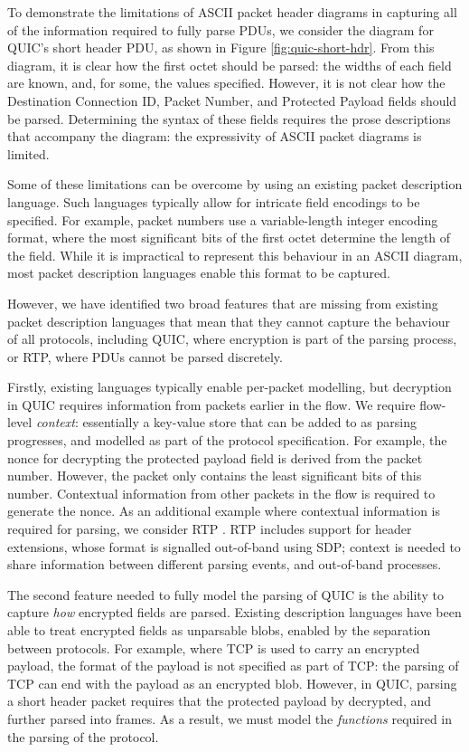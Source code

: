 \documentclass[10pt,sigconf]{acmart}
\begin{document}
To demonstrate the limitations of ASCII packet header diagrams in capturing all of the
information required to fully parse PDUs, we consider the diagram for QUIC's short header
PDU, as shown in Figure \ref{fig:quic-short-hdr}. From this diagram, it is clear how the
first octet should be parsed: the widths of each field are known, and, for some, the
values specified. However, it is not clear how the Destination Connection ID, Packet
Number, and Protected Payload fields should be parsed. Determining the syntax
of these fields requires the prose descriptions that accompany the diagram: the
expressivity of ASCII packet diagrams is limited.

Some of these limitations can be overcome by using an existing packet
description language. Such languages typically allow for intricate field encodings to be
specified. For example, packet numbers use a variable-length integer encoding format,
where the most significant bits of the first octet determine the length of the field.
While it is impractical to represent this behaviour in an ASCII diagram, most packet
description languages enable this format to be captured.

However, we have identified two broad features that are missing from existing packet
description languages that mean that they cannot capture the behaviour of all 
protocols, including QUIC, where
encryption is part of the parsing process, or RTP, where PDUs cannot be parsed discretely.

Firstly, existing languages typically enable per-packet modelling, but decryption in QUIC
requires information from packets earlier in the flow. We require flow-level
\emph{context}: essentially a key-value store that can be added to as parsing progresses,
and modelled as part of the protocol specification. For example, the nonce for decrypting
the protected payload field is derived from the packet number. However, the packet only
contains the least significant bits of this number. Contextual information from other
packets in the flow is required to generate the nonce. As an additional example where 
contextual information is required for parsing, we consider RTP \cite{RFC3550}. RTP
includes support for header extensions, whose format is signalled out-of-band using SDP;
context is needed to share information between different parsing events, and out-of-band
processes.

The second feature needed to fully model the parsing of QUIC is the ability to capture
\emph{how} encrypted fields are parsed. Existing description
languages have been able to treat encrypted fields as unparsable blobs, enabled by the
separation between protocols. For example, where TCP is used to carry an encrypted
payload, the format of the payload is not specified as part of TCP: the parsing of TCP can
end with the payload as an encrypted blob. However, in QUIC, parsing a short header packet
requires that the protected payload by decrypted, and further parsed into frames. As a
result, we must model the \emph{functions} required in the parsing of the protocol.
\end{document}
